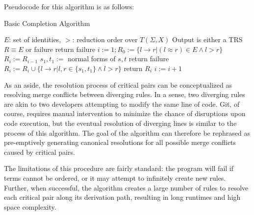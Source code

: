 \documentclass{article}
\begin{document}
Pseudocode for this algorithm is as follows:
\begin{algorithm}[H]
\caption{Basic Completion Algorithm}\label{alg:cap}
\begin{algorithmic}
\Require $E$: set of identities, $>$: reduction order over $T(\Sigma,X)$
\Ensure Output is either a TRS $R \equiv E$ or failure
return failure
\EndIf
\State $i:=1; R_0 := \{l \rightarrow r | (l \approx r) \in E \land l > r\}$
\State $R_i := R_{i-1}$
\State $s_1,t_1 :=$ normal forms of $s,t$
return failure
\EndIf
\State $R_i := R_i \cup \{l \rightarrow r | l,r \in \{s_1, t_1\} \land l > r\}$
\EndFor
{}
return $R_i$
\EndIf
\State $i := i+1$
\EndWhile
\end{algorithmic}
\end{algorithm}

As an aside, the resolution process of critical pairs can be conceptualized as resolving merge conflicts between diverging rules.
In a sense, two diverging rules are akin to two developers attempting to modify the same line of code. Git, of course, requires manual intervention
to minimize the chance of disruptions upon code execution, but the eventual resolution of diverging lines is similar to the process of this algorithm.
The goal of the algorithm can therefore be rephrased as pre-emptively generating canonical resolutions for all possible merge conflicts caused by critical pairs.

The limitations of this procedure are fairly standard: the program will fail if terms cannot be ordered, or it may attempt to infinitely create new rules.
Further, when successful, the algorithm creates a large number of rules to resolve each critical pair along its derivation path, resulting in
long runtimes and high space complexity.
\end{document}
